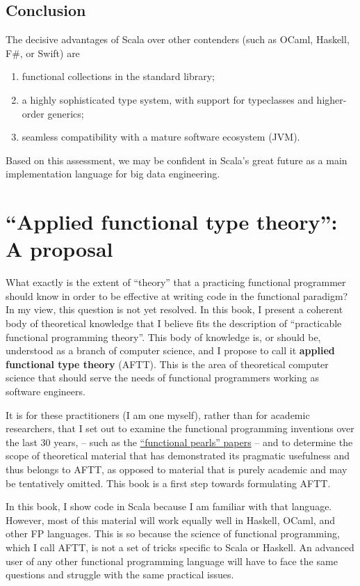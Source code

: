 \section{Conclusion}

The decisive advantages of Scala over other contenders (such as OCaml,
Haskell, F\#, or Swift) are
\begin{enumerate}
\item functional collections in the standard library;
\item a highly sophisticated type system, with support for typeclasses and
higher-order generics; 
\item seamless compatibility with a mature software ecosystem (JVM). 
\end{enumerate}
Based on this assessment, we may be confident in Scala's great future
as a main implementation language for big data engineering. 

\chapter{``Applied functional type theory'': A proposal}

What exactly is the extent of ``theory'' that a practicing functional
programmer should know in order to be effective at writing code in
the functional paradigm? In my view, this question is not yet resolved.
In this book, I present a coherent body of theoretical knowledge that
I believe fits the description of ``practicable functional programming
theory''. This body of knowledge is, or should be, understood as
a branch of computer science, and I propose to call it\textbf{ applied
functional type theory} (AFTT). This is the area of theoretical computer
science that should serve the needs of functional programmers working
as software engineers.

It is for these practitioners (I am one myself), rather than for academic
researchers, that I set out to examine the functional programming
inventions over the last 30 years, – such as the \href{https://wiki.haskell.org/Research_papers/Functional_pearls}{“functional pearls” papers}
– and to determine the scope of theoretical material that has demonstrated
its pragmatic usefulness and thus belongs to AFTT, as opposed to material
that is purely academic and may be tentatively omitted. This book
is a first step towards formulating AFTT.

In this book, I show code in Scala because I am familiar with that
language. However, most of this material will work equally well in
Haskell, OCaml, and other FP languages. This is so because the science
of functional programming, which I call AFTT, is not a set of tricks
specific to Scala or Haskell. An advanced user of any other functional
programming language will have to face the same questions and struggle
with the same practical issues.

